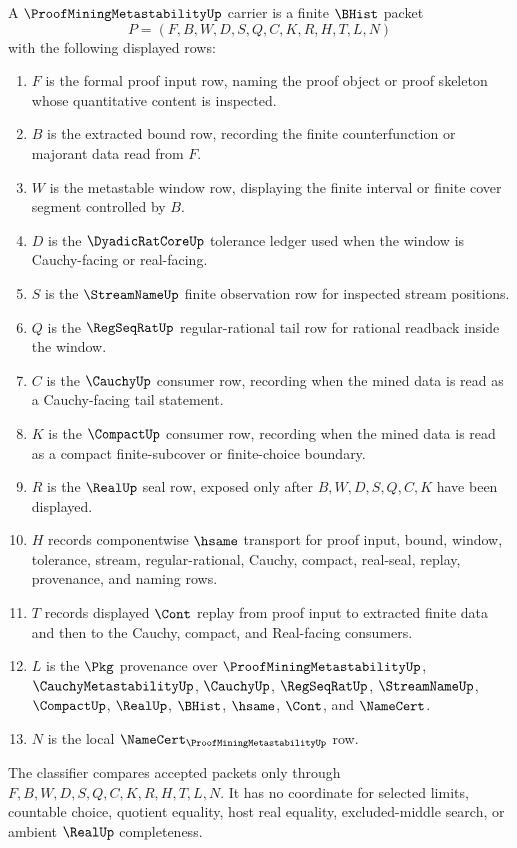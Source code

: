 \begin{definition}
\label{def:proof-mining-metastability-carrier}
A $\ProofMiningMetastabilityUp$ carrier is a finite $\BHist$ packet
$$
P=(F,B,W,D,S,Q,C,K,R,H,T,L,N)
$$
with the following displayed rows:
\begin{enumerate}
\item $F$ is the formal proof input row, naming the proof object or proof skeleton whose quantitative content is inspected.
\item $B$ is the extracted bound row, recording the finite counterfunction or majorant data read from $F$.
\item $W$ is the metastable window row, displaying the finite interval or finite cover segment controlled by $B$.
\item $D$ is the $\DyadicRatCoreUp$ tolerance ledger used when the window is Cauchy-facing or real-facing.
\item $S$ is the $\StreamNameUp$ finite observation row for inspected stream positions.
\item $Q$ is the $\RegSeqRatUp$ regular-rational tail row for rational readback inside the window.
\item $C$ is the $\CauchyUp$ consumer row, recording when the mined data is read as a Cauchy-facing tail statement.
\item $K$ is the $\CompactUp$ consumer row, recording when the mined data is read as a compact finite-subcover or finite-choice boundary.
\item $R$ is the $\RealUp$ seal row, exposed only after $B,W,D,S,Q,C,K$ have been displayed.
\item $H$ records componentwise $\hsame$ transport for proof input, bound, window, tolerance, stream, regular-rational, Cauchy, compact, real-seal, replay, provenance, and naming rows.
\item $T$ records displayed $\Cont$ replay from proof input to extracted finite data and then to the Cauchy, compact, and Real-facing consumers.
\item $L$ is the $\Pkg$ provenance over $\ProofMiningMetastabilityUp$, $\CauchyMetastabilityUp$, $\CauchyUp$, $\RegSeqRatUp$, $\StreamNameUp$, $\CompactUp$, $\RealUp$, $\BHist$, $\hsame$, $\Cont$, and $\NameCert$.
\item $N$ is the local $\NameCert_{\ProofMiningMetastabilityUp}$ row.
\end{enumerate}
The classifier compares accepted packets only through $F,B,W,D,S,Q,C,K,R,H,T,L,N$. It has no coordinate for selected limits, countable choice, quotient equality, host real equality, excluded-middle search, or ambient $\RealUp$ completeness.
\end{definition}

